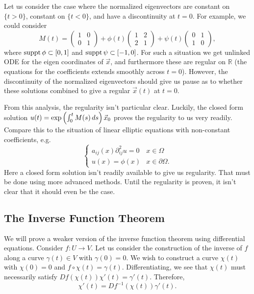 Let us consider the case where the normalized eigenvectors are constant on \(\{t>0\}\), constant on \(\{t<0\}\), and have a discontinuity at \(t=0\). For example, we could consider
 \begin{equation}
 M(t) = \begin{pmatrix}1 & 0\\0 & 1 \end{pmatrix} + \phi(t) \begin{pmatrix}1 & 2 \\ 2 & 1 \end{pmatrix} + \psi(t) \begin{pmatrix} 0 & 1\\ 1 & 0 \end{pmatrix},
 \end{equation}
where \( \operatorname{suppt} \phi \subset [0,1]\) and \(\operatorname{suppt} \psi \subset [-1,0]\). For such a situation we get unlinked ODE for the eigen coordinates of \(\vec x\), and furthermore these are regular on \(\mathbb R\) (the equations for the coefficients extends smoothly across \(t=0\)). However, the discontinuity of the normalized eigenvectors should give us pause as to whether these solutions combined to give a regular \(\vec x(t)\) at \(t=0\).

From this analysis, the regularity isn't particular clear. Luckily, the closed form solution \(u(t) =  \exp\left( \int_0^t M(s) \, ds \right) \vec x_0\) proves the regularity to us very readily. Compare this to the situation of linear elliptic equations with non-constant coefficients, e.g.
\begin{equation}
\begin{cases}
a_{ij}(x)  \partial^2_{ij}u = 0 & x \in\Omega\\
u (x) = \phi(x) & x \in\partial \Omega.
\end{cases}
\end{equation}
Here a closed form solution isn't readily available to give us regularity. That must be done using more advanced methods.
Until the regularity is proven, it isn't clear that it should even be the case.

\subsection{The Inverse Function Theorem}

We will prove a weaker version of the inverse function theorem using differential equations. Consider $f: U \to V$. Let us consider the construction of the inverse of $f$ along a curve $\gamma(t) \in V$ with $\gamma(0) = 0$. We wish to construct a curve $\chi(t)$ with $\chi(0) = 0$ and $f\circ \chi (t) = \gamma(t)$. Differentiating, we see that $\chi(t)$ must necessarily satisfy $Df(\chi(t))\chi'(t) = \gamma'(t)$. Therefore, 
\begin{equation}\label{eq:analysis_1}
\chi'(t) = Df^{-1}(\chi(t)) \gamma'(t).
\end{equation}

